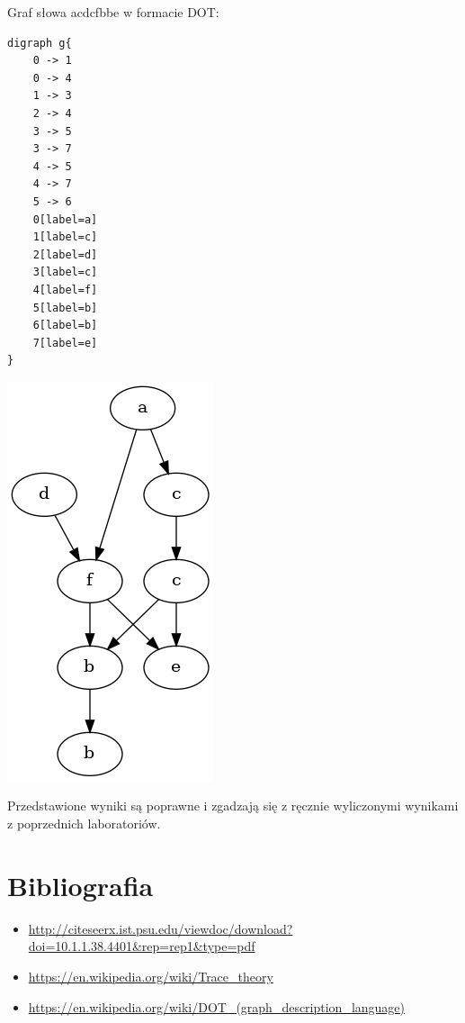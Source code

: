 \documentclass[12pt]{article}
\begin{document}
\noindent
Graf słowa acdcfbbe w formacie DOT:
\begin{verbatim}
digraph g{
	0 -> 1
	0 -> 4
	1 -> 3
	2 -> 4
	3 -> 5
	3 -> 7
	4 -> 5
	4 -> 7
	5 -> 6
	0[label=a]
	1[label=c]
	2[label=d]
	3[label=c]
	4[label=f]
	5[label=b]
	6[label=b]
	7[label=e]
}
\end{verbatim}

\begin{center}
\centering
    \includegraphics[scale=0.5]{acdcfbbe_dot.png}
\end{center}

Przedstawione wyniki są poprawne i zgadzają się z ręcznie wyliczonymi wynikami z poprzednich laboratoriów.

\newpage
\section{Bibliografia}
\begin{itemize}
    \item \url{http://citeseerx.ist.psu.edu/viewdoc/download?doi=10.1.1.38.4401&rep=rep1&type=pdf}
    \item \url{https://en.wikipedia.org/wiki/Trace_theory}
    \item \url{https://en.wikipedia.org/wiki/DOT_(graph_description_language)}

\end{itemize}
\end{document}

